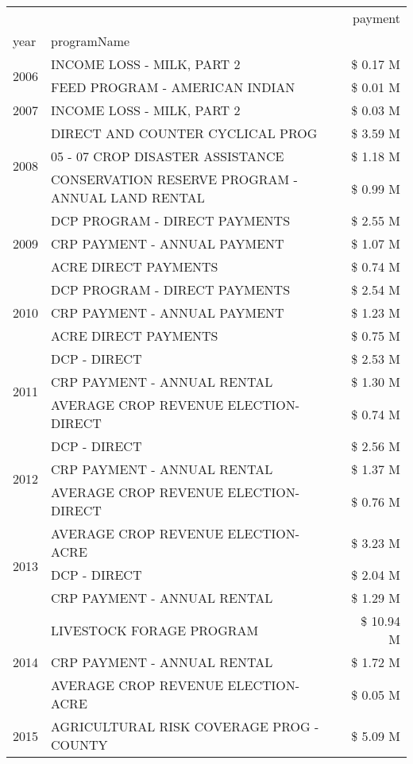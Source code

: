 \begin{tabular}{llr}
\toprule
 &  & payment \\
year & programName &  \\
\midrule
\multirow[t]{2}{*}{2006} & INCOME LOSS - MILK, PART 2 & \$ 0.17 M \\
 & FEED PROGRAM - AMERICAN INDIAN & \$ 0.01 M \\
\cline{1-3}
2007 & INCOME LOSS - MILK, PART 2 & \$ 0.03 M \\
\cline{1-3}
\multirow[t]{3}{*}{2008} & DIRECT AND COUNTER CYCLICAL PROG & \$ 3.59 M \\
 & 05 - 07 CROP DISASTER ASSISTANCE & \$ 1.18 M \\
 & CONSERVATION RESERVE PROGRAM - ANNUAL LAND RENTAL & \$ 0.99 M \\
\cline{1-3}
\multirow[t]{3}{*}{2009} & DCP PROGRAM - DIRECT PAYMENTS & \$ 2.55 M \\
 & CRP PAYMENT - ANNUAL PAYMENT & \$ 1.07 M \\
 & ACRE DIRECT PAYMENTS & \$ 0.74 M \\
\cline{1-3}
\multirow[t]{3}{*}{2010} & DCP PROGRAM - DIRECT PAYMENTS & \$ 2.54 M \\
 & CRP PAYMENT - ANNUAL PAYMENT & \$ 1.23 M \\
 & ACRE DIRECT PAYMENTS & \$ 0.75 M \\
\cline{1-3}
\multirow[t]{3}{*}{2011} & DCP - DIRECT & \$ 2.53 M \\
 & CRP PAYMENT - ANNUAL RENTAL & \$ 1.30 M \\
 & AVERAGE CROP REVENUE ELECTION-DIRECT & \$ 0.74 M \\
\cline{1-3}
\multirow[t]{3}{*}{2012} & DCP - DIRECT & \$ 2.56 M \\
 & CRP PAYMENT - ANNUAL RENTAL & \$ 1.37 M \\
 & AVERAGE CROP REVENUE ELECTION-DIRECT & \$ 0.76 M \\
\cline{1-3}
\multirow[t]{3}{*}{2013} & AVERAGE CROP REVENUE ELECTION-ACRE & \$ 3.23 M \\
 & DCP - DIRECT & \$ 2.04 M \\
 & CRP PAYMENT - ANNUAL RENTAL & \$ 1.29 M \\
\cline{1-3}
\multirow[t]{3}{*}{2014} & LIVESTOCK FORAGE PROGRAM & \$ 10.94 M \\
 & CRP PAYMENT - ANNUAL RENTAL & \$ 1.72 M \\
 & AVERAGE CROP REVENUE ELECTION-ACRE & \$ 0.05 M \\
\cline{1-3}
\multirow[t]{3}{*}{2015} & AGRICULTURAL RISK COVERAGE PROG - COUNTY & \$ 5.09 M \\

\end{tabular}
